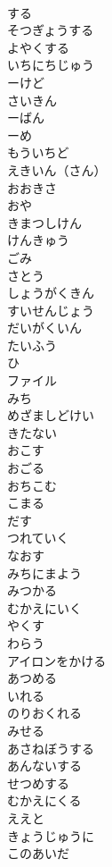 \documentclass[8pt]{extreport}
\begin{document}
\begin{CJK}{UTF8}{min}
\\	する	
\\	そつぎょうする	
\\	よやくする	
\\	いちにちじゅう	
\\	ーけど	
\\	さいきん	
\\	ーばん	
\\	ーめ	
\\	もういちど	
\\	えきいん（さん）	
\\	おおきさ	
\\	おや	
\\	きまつしけん	
\\	けんきゅう	
\\	ごみ	
\\	さとう	
\\	しょうがくきん	
\\	すいせんじょう	
\\	だいがくいん	
\\	たいふう	
\\	ひ	
\\	ファイル	
\\	みち	
\\	めざましどけい	
\\	きたない	
\\	おこす	
\\	おごる	
\\	おちこむ	
\\	こまる	
\\	だす	
\\	つれていく	
\\	なおす	
\\	みちにまよう	
\\	みつかる	
\\	むかえにいく	
\\	やくす	
\\	わらう	
\\	アイロンをかける	
\\	あつめる	
\\	いれる	
\\	のりおくれる	
\\	みせる	
\\	あさねぼうする	
\\	あんないする	
\\	せつめする	
\\	むかえにくる	
\\	ええと	
\\	きょうじゅうに	
\\	このあいだ	

\end{CJK}
\end{document}
